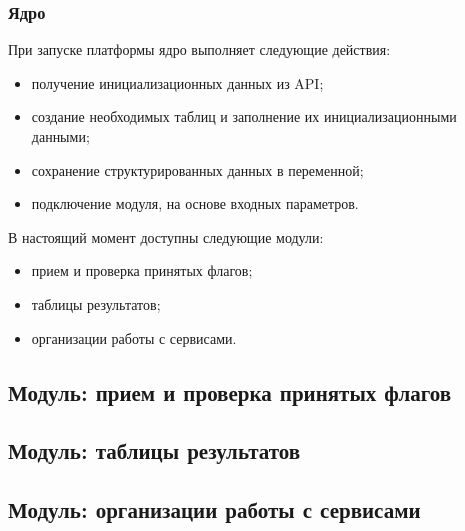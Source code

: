 \subsubsection{Ядро}

При запуске платформы ядро выполняет следующие действия:
\begin{itemize} 
\item получение инициализационных данных из API;
\item создание необходимых таблиц и заполнение их инициализационными данными; 
\item сохранение структурированных данных в переменной;
\item подключение модуля, на основе входных параметров.
\end{itemize}

В настоящий момент доступны следующие модули:
\begin{itemize} 
\item прием и проверка принятых флагов;
\item таблицы результатов; 
\item организации работы с сервисами.
\end{itemize}


\subsection{Модуль: прием и проверка принятых флагов} %


\subsection{Модуль: таблицы результатов} %


\subsection{Модуль: организации работы с сервисами} %


\clearpage